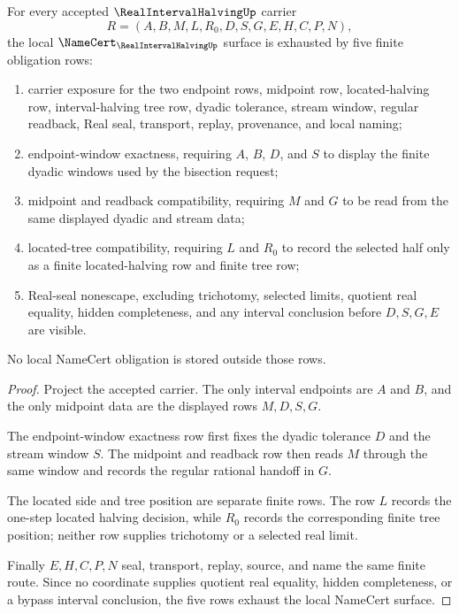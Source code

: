 \begin{theorem}
\label{thm:real-interval-halving-namecert-obligations}
For every accepted $\RealIntervalHalvingUp$ carrier
$$
R=(A,B,M,L,R_{0},D,S,G,E,H,C,P,N),
$$
the local $\NameCert_{\RealIntervalHalvingUp}$ surface is exhausted by five finite obligation rows:
\begin{enumerate}
\item carrier exposure for the two endpoint rows, midpoint row, located-halving row, interval-halving tree row, dyadic tolerance, stream window, regular readback, Real seal, transport, replay, provenance, and local naming;
\item endpoint-window exactness, requiring $A$, $B$, $D$, and $S$ to display the finite dyadic windows used by the bisection request;
\item midpoint and readback compatibility, requiring $M$ and $G$ to be read from the same displayed dyadic and stream data;
\item located-tree compatibility, requiring $L$ and $R_{0}$ to record the selected half only as a finite located-halving row and finite tree row;
\item Real-seal nonescape, excluding trichotomy, selected limits, quotient real equality, hidden completeness, and any interval conclusion before $D,S,G,E$ are visible.
\end{enumerate}
No local NameCert obligation is stored outside those rows.
\end{theorem}
\begin{proof}
Project the accepted carrier. The only interval endpoints are $A$ and $B$, and the only midpoint data are the displayed rows $M,D,S,G$.

The endpoint-window exactness row first fixes the dyadic tolerance $D$ and the stream window $S$. The midpoint and readback row then reads $M$ through the same window and records the regular rational handoff in $G$.

The located side and tree position are separate finite rows. The row $L$ records the one-step located halving decision, while $R_{0}$ records the corresponding finite tree position; neither row supplies trichotomy or a selected real limit.

Finally $E,H,C,P,N$ seal, transport, replay, source, and name the same finite route. Since no coordinate supplies quotient real equality, hidden completeness, or a bypass interval conclusion, the five rows exhaust the local NameCert surface.
\end{proof}


